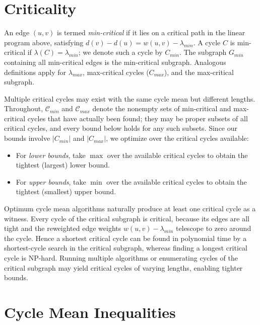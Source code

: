\documentclass{article}
\theoremstyle{definition}
\begin{document}
\section{Criticality}
\label{sec:criticality}

An edge $(u,v)$ is termed \textit{min-critical} if it lies on a
critical path in the linear program above, satisfying
$d(v)-d(u)=w(u,v)-\lambda_{min}$. A cycle $C$ is min-critical if
$\lambda(C)=\lambda_{min}$; we denote such a cycle by $C_{min}$. The
subgraph $G_{min}$ containing all min-critical edges is the
min-critical subgraph. Analogous definitions apply for
$\lambda_{max}$, max-critical cycles ($C_{max}$), and the max-critical
subgraph.

Multiple critical cycles may exist with the same cycle mean but
different lengths. Throughout, $\mathcal{C}_{min}$ and
$\mathcal{C}_{max}$ denote the nonempty sets of min-critical and
max-critical cycles that have actually been found; they may be proper
subsets of all critical cycles, and every bound below holds for any
such subsets. Since our bounds involve $|C_{min}|$ and $|C_{max}|$, we
optimize over the critical cycles available:
\begin{itemize}
  \item For \textit{lower bounds}, take $\max$ over the available
    critical cycles to obtain the tightest (largest) lower bound.
  \item For \textit{upper bounds}, take $\min$ over the available
    critical cycles to obtain the tightest (smallest) upper bound.
\end{itemize}
Optimum cycle mean algorithms naturally produce at least one critical
cycle as a witness. Every cycle of the critical subgraph is critical,
because its edges are all tight and the reweighted edge weights
$w(u,v) - \lambda_{min}$ telescope to zero around the cycle. Hence a
shortest critical cycle can be found in polynomial time by a
shortest-cycle search in the critical subgraph, whereas finding a
longest critical cycle is NP-hard. Running multiple algorithms or
enumerating cycles of the critical subgraph may yield critical cycles
of varying lengths, enabling tighter bounds.

\section{Cycle Mean Inequalities}
\label{sec:basic-results}
\end{document}
